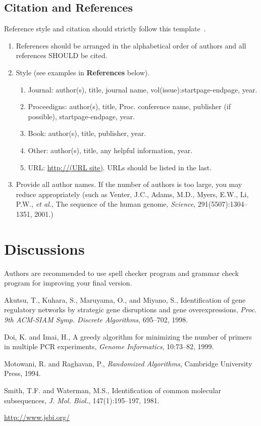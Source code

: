 \documentclass[twoside,11pt]{article}
\begin{document}
\subsection{Citation and References}

Reference style and citation should strictly follow this
template~\cite{akutsu98,doi99,motowani94,sw81,JSBi}.

\begin{enumerate}
\item References should be arranged in the alphabetical order of
authors and all references SHOULD be cited.
\item  Style (see examples in {\bf References} below).
\begin{enumerate}
\item Journal: author(s), title, journal name,
vol(issue):startpage-endpage, year.
\item Proceedigns: author(s), title, Proc. conference name, publisher
(if possible), startpage-endpage, year.
\item  Book: author(s), title, publisher, year.
\item  Other: author(s), title, any helpful information, year.
\item  URL: \url{http://(URL site)}.  URLs should be listed in the last.
\end{enumerate}
\item Provide all author names.  If the number of authors is
too large, you may reduce appropriately (such as
Venter, J.C., Adams, M.D., Myers, E.W., Li, P.W., {\em et al.},
The sequence of the human genome,
{\em Science}, 291(5507):1304--1351, 2001.)
\end{enumerate}

\section{Discussions}

Authors are recommended to use spell checker program and grammar check
program for improving your final version.

\begin{thebibliography}{99}
Akutsu, T., Kuhara, S., Maruyama, O., and Miyano, S.,
Identification of gene regulatory networks by strategic gene
disruptions and gene overexpressions,
{\em Proc. 9th ACM-SIAM Symp. Discrete Algorithms}, 695--702, 1998.

Doi, K. and Imai, H.,
A greedy algorithm for minimizing the number of primers in
multiple PCR experiments,
{\em Genome Informatics}, 10:73--82, 1999.

Motowani, R. and Raghavan, P.,
{\em Randomized Algorithms}, Cambridge University Press, 1994.

Smith, T.F. and Waterman, M.S.,
Identification of common molecular subsequences,
{\em J. Mol. Biol.}, 147(1):195--197, 1981.

\url{http://www.jsbi.org/}

\end{thebibliography}
\end{document}
